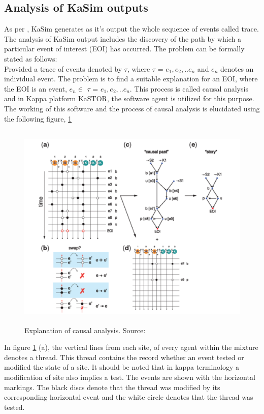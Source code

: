 \documentclass[msc,deptreport,ai]{infthesis}      %
\begin{document}
\subsection{Analysis of KaSim outputs}
As per \cite{kappaPlatform}, KaSim generates as it's output the whole sequence of events called trace. The analysis of KaSim output includes the discovery of the path by which a particular event of interest (EOI) has occurred. The problem can be formally stated as follows: \\
Provided a trace of events denoted by $\tau$, where $\tau$ = $e_1,e_2,..e_n$ and $e_n$ denotes an individual event. The problem is to find a suitable explanation for an EOI, where the EOI is an event, $e_n \in$ $\tau$ = $e_1,e_2,..e_n$. This process is called causal analysis and in Kappa platform KaSTOR, the software agent is utilized for this purpose. The working of this software and the process of causal analysis is elucidated using the following figure, \ref{fig:eoi}
\begin{figure}[H]
	\centering
	\captionsetup{justification=centering}
	\includegraphics[width=\linewidth,height=10cm,keepaspectratio]{eoi.png}	
	\caption{Explanation of causal analysis. Source: \cite{kappaPlatform}}
	\label{fig:eoi}
\end{figure}

In figure \ref{fig:eoi} (a), the vertical lines from each site, of every agent within the mixture denotes a thread. This thread contains the record whether an event tested or modified the state of a site. It should be noted that in kappa terminology a modification of site also implies a test. The events are shown with the horizontal markings. The black discs denote that the thread was modified by its corresponding horizontal event and the white circle denotes that the thread was tested.
\end{document}
